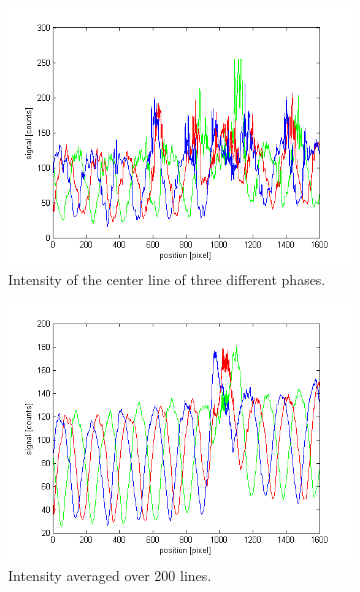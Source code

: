 \documentclass[a4paper, 12pt]{paper}
\begin{document}
\begin{figure}[H]
    \begin{subfigure}[t]{0.45\textwidth}
        \includegraphics[width=\textwidth]{img/intensity_1_line}
        \caption{Intensity of the center line of three different phases.}
    \end{subfigure}
    \begin{subfigure}[t]{0.45\textwidth}
        \includegraphics[width=\textwidth]{img/intensity_200_lines}
        \caption{Intensity averaged over 200 lines.}
    \end{subfigure}
    \begin{subfigure}[t]{0.45\textwidth}

\end{subfigure}
\end{figure}
\end{document}
